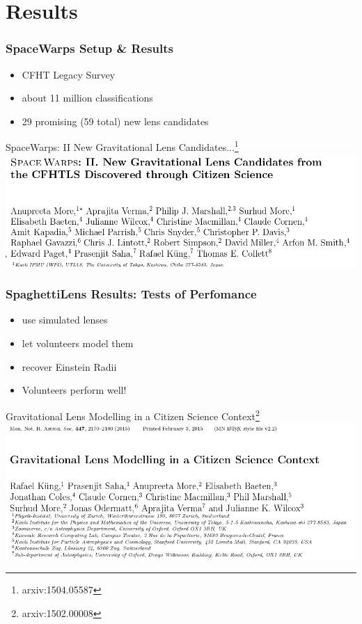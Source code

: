 \documentclass{beamer}
\begin{document}
\section{Results}

 \begin{frame}
   \frametitle{SpaceWarps Setup \& Results}
   \begin{itemize}
     \item CFHT Legacy Survey
     \item about 11 million classifications
     \item 29 promising (59 total) new lens candidates
   \end{itemize}
   
   \begin{block}{SpaceWarps: II New Gravitational Lens Candidates...\footnote{arxiv:1504.05587}}
     \includegraphics[width=\textwidth]{imgs/paper_sw2}
   \end{block}

 \end{frame}


 \begin{frame}
   \frametitle{SpaghettiLens Results: Tests of Perfomance}
   \begin{itemize}
     \item use simulated lenses
     \item let volunteers model them
     \item recover Einstein Radii
     \item Volunteers perform well!
   \end{itemize}

   \begin{block}{Gravitational Lens Modelling in a Citizen Science Context\footnote{arxiv:1502.00008}}
     \includegraphics[width=\textwidth]{imgs/paper_sl1}
   \end{block}

 \end{frame}
\end{document}
